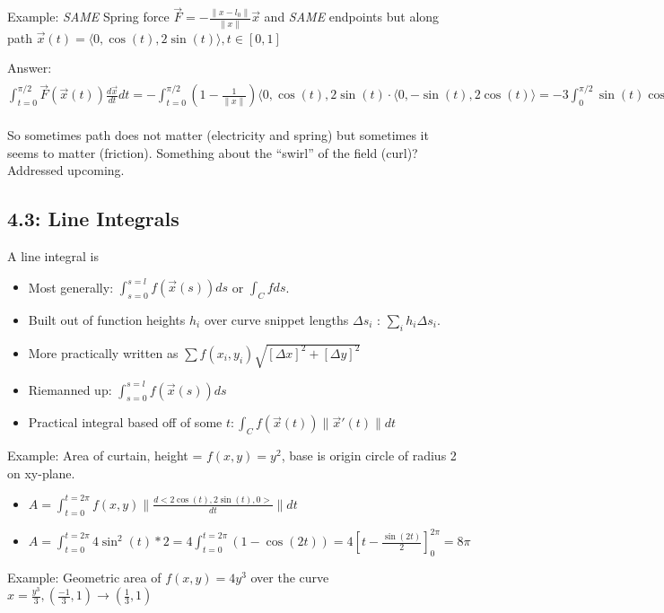 \documentclass[11pt, oneside]{article}   	%
\begin{document}
Example: \emph{SAME} Spring force $\vec{F} = -\frac{\|x - l_0\|}{\|x\|} \vec{x}$ and \emph{SAME} endpoints but along path $\vec{x}(t) = \langle 0, \cos(t), 2\sin(t) \rangle,  t \in [0,1]$

Answer: $\int_{t=0}^{\pi / 2} \vec{F}(\vec{x}(t)) \frac{d \vec{x}}{dt}dt  = - \int_{t=0}^{\pi / 2} (1 - \frac{1}{\|x\|})\langle 0, \cos(t), 2\sin(t) \cdot \langle 0, -\sin(t), 2\cos(t) \rangle= -3  \int_0^{\pi / 2} \sin(t)\cos(t)(1 - \frac{1}{\sqrt{1+3t^2}}dt = 3 \int_{t=0}^{\pi / 2} - \sin(t)\cos(t) + 3 \int_{t=0}^{\pi / 2} \sin(t)\cos(t) \frac{1}{\sqrt{1+3\sin^2(t)}} = 3[\frac{1}{2}\cos^2(t)]_0^{\pi / 2} + 3[\frac{2}{6}(1+3\sin^2(t))^{1/2}]_0^{\pi / 2} = -1/2$

So sometimes path does not matter (electricity and spring) but sometimes it seems to matter (friction). Something about the ``swirl'' of the field (curl)?  Addressed upcoming.


\subsection{4.3: Line Integrals}

A line integral is 
\begin{itemize} 
\item Most generally: $\int_{s=0}^{s=l} f(\vec{x}(s))ds$ or $\int_C f ds$.
\item Built out of function heights $h_i$ over curve snippet lengths $\Delta s_i$ : $\sum_i h_i \Delta s_i$.
\item More practically written as $\sum f(x_i, y_i)\sqrt{[\Delta x]^2 + [\Delta y]^2}$
\item Riemanned up: $\int_{s=0}^{s=l} f(\vec{x}(s))ds$
\item Practical integral based off of some $t: \int_C f(\vec{x}(t))\|\vec{x}'(t)\|dt$
\end{itemize}

Example: Area of curtain, height = $f(x,y) = y^2$, base is origin circle of radius 2 on xy-plane.
\begin{itemize}
\item $A = \int_{t=0}^{t=2\pi} f(x,y) \|  \frac{d<2 \cos (t), 2 \sin (t), 0>}{dt} \|dt$
\item $A = \int_{t=0}^{t=2\pi} 4\sin^2(t)  * 2 = 4 \int_{t=0}^{t=2\pi} (1 - \cos(2t)) = 4[t - \frac{\sin(2t)}{2}]_0^{2\pi} = 8 \pi$
\end{itemize}

Example: Geometric area of $f(x,y)=4y^3$ over the curve $x = \frac{y^3}{3}, (\frac{-1}{3}, 1) \rightarrow  (\frac{1}{3}, 1)$
\end{document}
